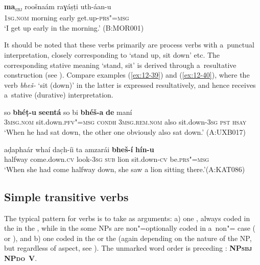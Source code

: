 \begin{exe}
\ex
\label{ex:12-38}
\gll {\ob}\textbf{ma}{\cb}\textsubscript{\textsc{\upshape sbj}} roošnaám raɣáṣṭi uth-áan-u  \\
1\textsc{sg.nom} morning early get.up-\textsc{prs"=msg} \\
\glt `I get up early in the morning.' (B:MOR001)
\end{exe}

It should be noted that these verbs primarily are process verbs with a~punctual interpretation, closely corresponding to \iliEnglish `stand up, sit down' etc. The corresponding stative meaning `stand, sit' is derived through a~resultative construction (see ). Compare examples (\ref{ex:12-39}) and (\ref{ex:12-40}), where the verb \textit{bheš-} `sit (down)' in the latter is expressed resultatively, and hence receives a~stative (durative) interpretation.

\begin{exe}
\ex
\label{ex:12-39}
\gll so \textbf{bhéṭ-u} \textbf{seentá} so bi \textbf{bhéš-a} \textbf{de} maní \\
\textsc{3msg.nom} sit.down.\textsc{pfv"=msg} \textsc{condh} \textsc{3msg.rem.nom} also  sit.down-\textsc{3sg} \textsc{pst } \textsc{hsay} \\
\glt `When he had sat down, the other one obviously also sat down.' (A:UXB017)

\ex
\label{ex:12-40}
\gll aḍaphaár whaí dac̣h-íi ta amzarái \textbf{bheš-í} \textbf{hín-u} \\
halfway come.down.\textsc{cv} look-\textsc{3sg } \textsc{sub} lion sit.down-\textsc{cv} be.\textsc{prs"=msg} \\
\glt `When she had come halfway down, she saw a lion sitting there.'\newline (A:KAT086)
\end{exe}

\subsection{Simple {transitive} verbs}
\label{subsec:12-2-3}


The typical pattern for  verbs is to take as arguments: a) one   , always coded in the  in the , while in the  some NPs are non"=optionally coded in a~non"= case ( or ), and b) one    coded in the  or the  (again depending on the nature of the NP, but regardless of aspect, see ). The unmarked word order is  preceding : \textbf{NP\textsc{sbj}} \textbf{NP\textsc{do}}~\textbf{V}.


